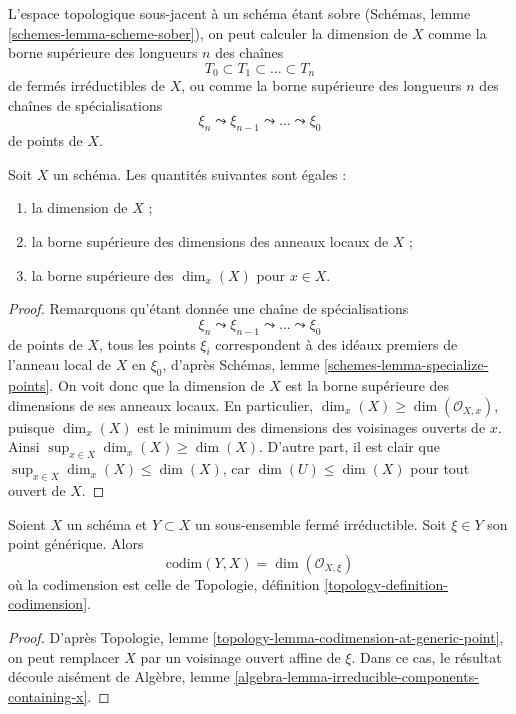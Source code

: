 \noindent
L'espace topologique sous-jacent à un schéma étant sobre
(Schémas, lemme \ref{schemes-lemma-scheme-sober}),
on peut calculer la dimension de $X$ comme la borne supérieure des longueurs $n$
des chaînes
$$
T_0 \subset T_1 \subset \ldots \subset T_n
$$
de fermés irréductibles de $X$, ou comme la borne supérieure des longueurs $n$
des chaînes de spécialisations
$$
\xi_n \leadsto \xi_{n - 1} \leadsto \ldots \leadsto \xi_0
$$
de points de $X$.

\begin{lemma}
\label{lemma-dimension}
Soit $X$ un schéma. Les quantités suivantes sont égales :
\begin{enumerate}
\item la dimension de $X$ ;
\item la borne supérieure des dimensions des anneaux locaux de $X$ ;
\item la borne supérieure des $\dim_x(X)$ pour $x \in X$.
\end{enumerate}
\end{lemma}

\begin{proof}
Remarquons qu'étant donnée une chaîne de spécialisations
$$
\xi_n \leadsto \xi_{n - 1} \leadsto \ldots \leadsto \xi_0
$$
de points de $X$, tous les points $\xi_i$ correspondent à des idéaux premiers
de l'anneau local de $X$ en $\xi_0$, d'après
Schémas, lemme \ref{schemes-lemma-specialize-points}.
On voit donc que la dimension de $X$ est la borne supérieure des dimensions
de ses anneaux locaux. En particulier, $\dim_x(X) \geq \dim(\mathcal{O}_{X, x})$,
puisque $\dim_x(X)$ est le minimum des dimensions des voisinages ouverts de
$x$. Ainsi $\sup_{x \in X} \dim_x(X) \geq \dim(X)$. D'autre part,
il est clair que $\sup_{x \in X} \dim_x(X) \leq \dim(X)$,
car $\dim(U) \leq \dim(X)$ pour tout ouvert de $X$.
\end{proof}

\begin{lemma}
\label{lemma-codimension-local-ring}
Soient $X$ un schéma et $Y \subset X$ un sous-ensemble fermé
irréductible. Soit $\xi \in Y$ son point générique. Alors
$$
\text{codim}(Y, X) = \dim(\mathcal{O}_{X, \xi})
$$
où la codimension est celle de
Topologie, définition \ref{topology-definition-codimension}.
\end{lemma}

\begin{proof}
D'après Topologie, lemme \ref{topology-lemma-codimension-at-generic-point},
on peut remplacer $X$ par un voisinage ouvert affine de $\xi$. Dans ce
cas, le résultat découle aisément de
Algèbre, lemme \ref{algebra-lemma-irreducible-components-containing-x}.
\end{proof}

